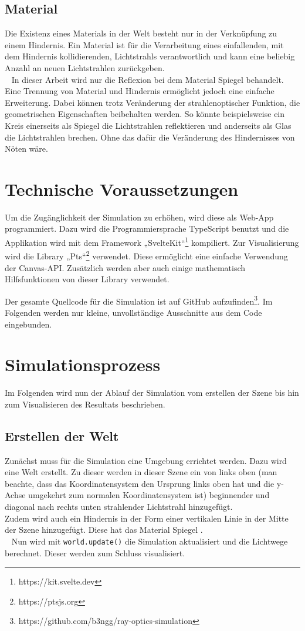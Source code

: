 \section{Material}
\label{material}
Die Existenz eines Materials  in der Welt besteht nur in der Verknüpfung zu einem Hindernis. 
Ein Material ist für die Verarbeitung eines einfallenden, mit dem Hindernis kollidierenden, Lichtstrahls verantwortlich 
und kann eine beliebig Anzahl an neuen Lichtstrahlen zurückgeben. \\ 
In dieser Arbeit wird nur die Reflexion bei dem Material Spiegel  behandelt. 
Eine Trennung von Material und Hindernis ermöglicht jedoch eine einfache Erweiterung.
Dabei können trotz Veränderung der strahlenoptischer Funktion, die geometrischen Eigenschaften beibehalten werden.
So könnte beispielsweise ein Kreis einerseits als Spiegel die Lichtstrahlen reflektieren 
und anderseits als Glas die Lichtstrahlen brechen. Ohne das dafür die Veränderung des Hindernisses von Nöten wäre.


\chapter{Technische Voraussetzungen}
Um die Zugänglichkeit der Simulation zu erhöhen, wird diese als Web-App programmiert. 
Dazu wird die Programmiersprache TypeScript benutzt und die Applikation wird mit dem Framework „SvelteKit“\footnote{https://kit.svelte.dev} kompiliert.
Zur Visualisierung wird die Library „Pts“\footnote{https://ptsjs.org} verwendet. Diese ermöglicht eine einfache Verwendung der Canvas-API. 
Zusätzlich werden aber auch einige mathematisch Hilfsfunktionen von dieser Library verwendet.

Der gesamte Quellcode für die Simulation ist auf GitHub aufzufinden\footnote{https://github.com/b3ngg/ray-optics-simulation}. 
Im Folgenden werden nur kleine, unvollständige Ausschnitte aus dem Code eingebunden.


\chapter{Simulationsprozess}
Im Folgenden wird nun der Ablauf der Simulation vom erstellen der Szene bis hin zum Visualisieren des Resultats beschrieben.

\section{Erstellen der Welt}
Zunächst muss für die Simulation eine Umgebung errichtet werden. Dazu wird eine Welt erstellt.
Zu dieser werden in dieser Szene ein von links oben (man beachte, dass das Koordinatensystem den 
Ursprung links oben hat und die y-Achse umgekehrt zum normalen Koordinatensystem ist) beginnender und diagonal nach rechts 
unten strahlender Lichtstrahl hinzugefügt. \\
Zudem wird auch ein Hindernis in der Form einer vertikalen Linie in der Mitte der Szene hinzugefügt. 
Diese hat das Material Spiegel . \\ 
Nun wird mit \texttt{world.update()} die Simulation aktualisiert und die Lichtwege berechnet. Dieser werden zum Schluss visualisiert.

